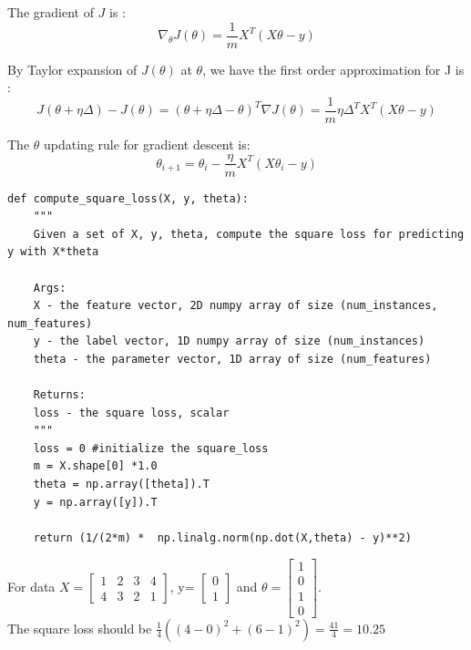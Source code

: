 \documentclass{article}
\newenvironment{sub}[2][$-$]{\begin{trivlist}
		\item[\hskip \labelsep {\bfseries #1}\hskip \labelsep {\bfseries #2.}]}  {\end{trivlist}}
\begin{document}
The gradient of $J $  is :\\ 
$$ \nabla_{\theta} J(\theta) = \frac{1}{m} X^T(X\theta - y)$$

\begin{sub}{2.2.3}
\end{sub}

By Taylor expansion of $J(\theta)$ at $\theta$, we have  the first order approximation for J is :\\ $$J(\theta+\eta\Delta) - J(\theta) =  (\theta+\eta\Delta - \theta)^T  \nabla J(\theta)   =  \frac{1}{m} \eta \Delta^T X^T(X\theta - y) $$


\begin{sub}{2.2.4}
\end{sub}

The $\theta$ updating rule for gradient descent is:\\
$$ \theta_{i+1} = \theta_{i} - \frac{\eta}{m} X^T(X\theta_{i} - y) $$

\pagebreak

\begin{sub}{2.2.5}
	
\end{sub}

\begin{verbatim}
def compute_square_loss(X, y, theta):
	"""
	Given a set of X, y, theta, compute the square loss for predicting y with X*theta
	
	Args:
	X - the feature vector, 2D numpy array of size (num_instances, num_features)
	y - the label vector, 1D numpy array of size (num_instances)
	theta - the parameter vector, 1D array of size (num_features)
	
	Returns:
	loss - the square loss, scalar
	"""
	loss = 0 #initialize the square_loss
	m = X.shape[0] *1.0
	theta = np.array([theta]).T
	y = np.array([y]).T
	
	return (1/(2*m) *  np.linalg.norm(np.dot(X,theta) - y)**2)

\end{verbatim}

\begin{sub}{2.2.6}
\end{sub}

For data $X = \begin{bmatrix}
1 &2&3&4\\ 4&3&2&1
\end{bmatrix}$, y= $\begin{bmatrix} 0\\1 \end{bmatrix} $ and $\theta = \begin{bmatrix} 1\\0\\1\\0 \end{bmatrix}$. \\The square loss should be $\frac{1}{4} ((4-0)^2 + (6-1)^2) = \frac{41}{4} = 10.25$\\
\end{document}
